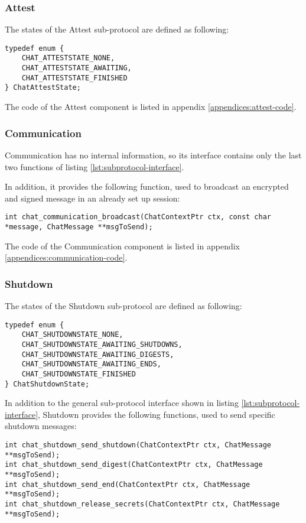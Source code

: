 \subsubsection{Attest}
The states of the Attest sub-protocol are defined as following:
\begin{lstlisting}[caption={Attest states}]
typedef enum {
    CHAT_ATTESTSTATE_NONE,
    CHAT_ATTESTSTATE_AWAITING,
    CHAT_ATTESTSTATE_FINISHED
} ChatAttestState;
\end{lstlisting}

The code of the Attest component is listed in appendix \ref{appendices:attest-code}.


\subsubsection{Communication}
Communication has no internal information, so its interface contains only the last two functions of listing \ref{lst:subprotocol-interface}.

In addition, it provides the following function, used to broadcast an encrypted and signed message in an already set up session:
\begin{lstlisting}[caption={Communication specific interface}]
int chat_communication_broadcast(ChatContextPtr ctx, const char *message, ChatMessage **msgToSend);
\end{lstlisting}

The code of the Communication component is listed in appendix \ref{appendices:communication-code}.

\subsubsection{Shutdown}
The states of the Shutdown sub-protocol are defined as following:
\begin{lstlisting}[caption={Shutdown states}]
typedef enum {
	CHAT_SHUTDOWNSTATE_NONE,
	CHAT_SHUTDOWNSTATE_AWAITING_SHUTDOWNS,
	CHAT_SHUTDOWNSTATE_AWAITING_DIGESTS,
	CHAT_SHUTDOWNSTATE_AWAITING_ENDS,
	CHAT_SHUTDOWNSTATE_FINISHED
} ChatShutdownState;
\end{lstlisting}

In addition to the general sub-protocol interface shown in listing \ref{lst:subprotocol-interface}, Shutdown provides the following functions, used to send specific shutdown messages:
\begin{lstlisting}[caption={Shutdown specific interface}]
int chat_shutdown_send_shutdown(ChatContextPtr ctx, ChatMessage **msgToSend);
int chat_shutdown_send_digest(ChatContextPtr ctx, ChatMessage **msgToSend);
int chat_shutdown_send_end(ChatContextPtr ctx, ChatMessage **msgToSend);
int chat_shutdown_release_secrets(ChatContextPtr ctx, ChatMessage **msgToSend);
\end{lstlisting}

